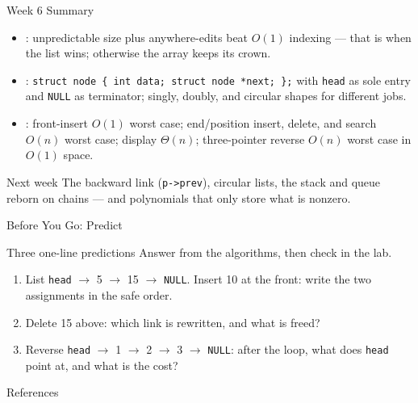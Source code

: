\documentclass[aspectratio=169]{beamer}
\begin{document}
\begin{frame}{Week 6 Summary}
  \begin{itemize}
    \item {}: unpredictable size plus anywhere-edits beat
      $O(1)$ indexing --- that is when the list wins; otherwise the array
      keeps its crown.
    \item {}: \texttt{struct node \{ int data; struct node *next;
      \};} with \texttt{head} as sole entry and \texttt{NULL} as terminator;
      singly, doubly, and circular shapes for different jobs.
    \item {}: front-insert $O(1)$ worst case; end/position
      insert, delete, and search $O(n)$ worst case; display $\Theta(n)$;
      three-pointer reverse $O(n)$ worst case in $O(1)$ space.
  \end{itemize}
  \begin{exampleblock}{Next week}
    The backward link (\texttt{p->prev}), circular lists, the stack and queue
    reborn on chains --- and polynomials that only store what is nonzero.
  \end{exampleblock}
\end{frame}

\begin{frame}{Before You Go: Predict}
  \begin{block}{Three one-line predictions}
    Answer from the algorithms, then check in the lab.
  \end{block}
  \begin{enumerate}
    \item List \texttt{head} $\to$ 5 $\to$ 15 $\to$ \texttt{NULL}. Insert 10 at
      the front: write the two assignments in the safe order.
    \item Delete 15 above: which link is rewritten, and what is freed?
    \item Reverse \texttt{head} $\to$ 1 $\to$ 2 $\to$ 3 $\to$ \texttt{NULL}:
      after the loop, what does \texttt{head} point at, and what is the cost?
  \end{enumerate}
\end{frame}

\begin{frame}[allowframebreaks]{References}
  \footnotesize
  
  
\end{frame}
\end{document}
